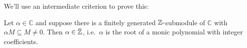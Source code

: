 \begin{remark}

We'll use an intermediate criterion to prove this:

\end{remark}

\begin{proposition}

Let \(\alpha\in {\mathbb{C}}\) and suppose there is a finitely generated
\({\mathbb{Z}}{\hbox{-}}\)submodule of \({\mathbb{C}}\) with
\(\alpha M \subseteq M \neq 0\). Then
\(\alpha\in \mkern 1.5mu\overline{\mkern-1.5mu{\mathbb{Z}}\mkern-1.5mu}\mkern 1.5mu\),
i.e.~\(\alpha\) is the root of a monic polynomial with integer
coefficients.

\end{proposition}

